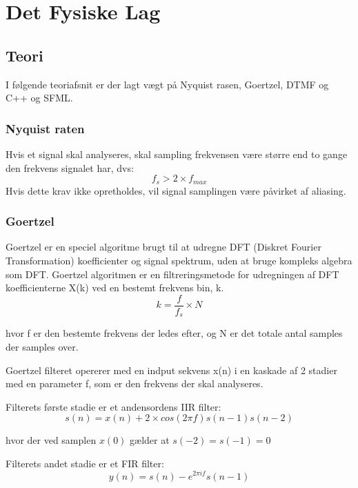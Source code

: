 \section{Det Fysiske Lag}
\subsection{Teori}
I følgende teoriafsnit er der lagt vægt på Nyquist rasen, Goertzel, DTMF og C++ og SFML.

\subsubsection{Nyquist raten}
Hvis et signal skal analyseres, skal sampling frekvensen være større end to gange den frekvens signalet har, dvs:
\begin{equation}
f_s > 2 \times f_{max} \label{eq:nyq}
\end{equation}
Hvis dette krav ikke opretholdes, vil signal samplingen være påvirket af aliasing.

\subsubsection{Goertzel}
Goertzel er en speciel algoritme brugt til at udregne DFT (Diskret Fourier Transformation) koefficienter og signal spektrum, uden at bruge kompleks algebra som DFT.
\newline
Goertzel algoritmen er en filtreringsmetode for udregningen af DFT koefficienterne X(k) ved en bestemt frekvens bin, k.
\begin{equation}
k = \frac{f}{f_s} \times N \label{eq:goe}
\end{equation}

hvor f er den bestemte frekvens der ledes efter, og N er det totale antal samples der samples over.
\hfill \break

Goertzel filteret opererer med en indput sekvens x(n) i en kaskade af 2 stadier med en parameter f, som er den frekvens der skal analyseres.
\hfill \break

Filterets første stadie er et andensordens IIR filter:
\begin{equation}
s(n) = x(n) + 2 \times cos(2 \pi f)s(n-1)s(n-2) \label{eq:IIR}
\end{equation}

hvor der ved samplen $x(0)$ gælder at $s(-2) = s(-1) = 0$
\hfill \break

Filterets andet stadie er et FIR filter:
\begin{equation}
y(n) = s(n) - e^{2 \pi if} s(n-1) \label{eq:FIR}
\end{equation}

